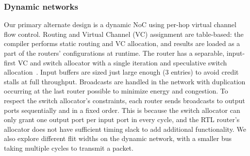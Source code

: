 \subsubsection{Dynamic networks}
Our primary alternate design is a dynamic NoC using per-hop virtual channel flow control. 
Routing and Virtual Channel (VC) assignment are table-based: the compiler performs static routing and VC allocation, 
and results are loaded as a part of the routers' configurations at runtime.
The router has a separable, input-first VC and switch allocator with a single iteration and speculative switch allocation~\cite{dallytowles}.
Input buffers are sized just large enough (3 entries) to avoid credit stalls at full throughput.
Broadcasts are handled in the network with duplication occurring at the last router possible to minimize energy and congestion.
To respect the switch allocator's constraints, each router sends broadcasts to output ports sequentially and in a fixed order.
This is because the switch allocator can only grant one output port per input port in every cycle, and the RTL router's allocator does not have sufficient timing slack to add additional functionality.
We also explore different flit widths on the dynamic network, with a smaller bus taking multiple cycles to transmit a packet.


